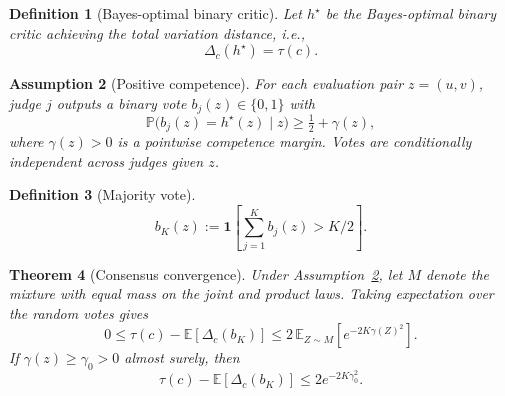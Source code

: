 \documentclass[11pt]{article}
\newtheorem{theorem}{Theorem}[section]
\newtheorem{definition}[theorem]{Definition}
\newtheorem{assumption}[theorem]{Assumption}
\newcommand{\E}{\mathbb{E}}
\newcommand{\Prob}{\mathbb{P}}
\begin{document}
\begin{definition}[Bayes-optimal binary critic]
\label{def:bayes-critic}
Let $h^\star$ be the Bayes-optimal binary critic achieving the total
variation distance, i.e.,
\begin{equation}
\Delta_c(h^\star) = \tau(c).
\end{equation}
\end{definition}

\begin{assumption}[Positive competence]
\label{asm:competence}
For each evaluation pair $z = (u, v)$, judge $j$ outputs a binary vote
$b_j(z) \in \{0, 1\}$ with
\begin{equation}
\Prob\!\big(b_j(z) = h^\star(z) \mid z\big) \ge \tfrac{1}{2} + \gamma(z),
\end{equation}
where $\gamma(z) > 0$ is a pointwise competence margin. Votes are
conditionally independent across judges given $z$.
\end{assumption}

\begin{definition}[Majority vote]
\label{def:majority-vote}
\begin{equation}
b_K(z) := \mathbf{1}\!\left[\sum_{j=1}^K b_j(z) > K/2\right].
\end{equation}
\end{definition}

\begin{theorem}[Consensus convergence]
\label{thm:consensus}
Under Assumption~\ref{asm:competence}, let $M$ denote the mixture
with equal mass on the joint and product laws. Taking expectation over the random votes gives
\begin{equation}
0 \le \tau(c) - \E[\Delta_c(b_K)] \le 2 \, \E_{Z \sim M}\!\left[
e^{-2K\gamma(Z)^2}\right].
\end{equation}
If $\gamma(z) \ge \gamma_0 > 0$ almost surely, then
\begin{equation}
\tau(c) - \E[\Delta_c(b_K)] \le 2 e^{-2K\gamma_0^2}.
\end{equation}
\end{theorem}
\end{document}
